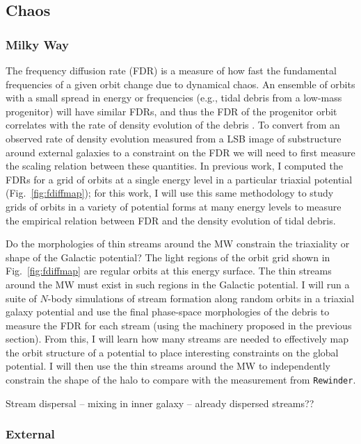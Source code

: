 
\subsection{Chaos}

\subsubsection{Milky Way}

The frequency diffusion rate (FDR) is a measure of how fast the fundamental frequencies of a given orbit change due to dynamical chaos. An ensemble of orbits with a small spread in energy or frequencies (e.g., tidal debris from a low-mass progenitor) will have similar FDRs, and thus the FDR of the progenitor orbit correlates with the rate of density evolution of the debris \citep{apw15-chaos}. To convert from an observed rate of density evolution measured from a LSB image of substructure around external galaxies to a constraint on the FDR we will need to first measure the scaling relation between these quantities. In previous work, I computed the FDRs for a grid of orbits at a single energy level in a particular triaxial potential (Fig.~\ref{fig:fdiffmap}); for this work, I will use this same methodology to study grids of orbits in a variety of potential forms at many energy levels to measure the empirical relation between FDR and the density evolution of tidal debris.

Do the morphologies of thin streams around the MW constrain the triaxiality or shape of the Galactic potential? The light regions of the orbit grid shown in Fig.~\ref{fig:fdiffmap} are regular orbits at this energy surface. The thin streams around the MW must exist in such regions in the Galactic potential. I will run a suite of $N$-body simulations of stream formation along random orbits in a triaxial galaxy potential and use the final phase-space morphologies of the debris to measure the FDR for each stream (using the machinery proposed in the previous section). From this, I will learn how many streams are needed to effectively map the orbit structure of a potential to place interesting constraints on the global potential. I will then use the thin streams around the MW to independently constrain the shape of the halo to compare with the measurement from \texttt{Rewinder}.

Stream dispersal -- mixing in inner galaxy -- already dispersed streams??

\subsubsection{External}

